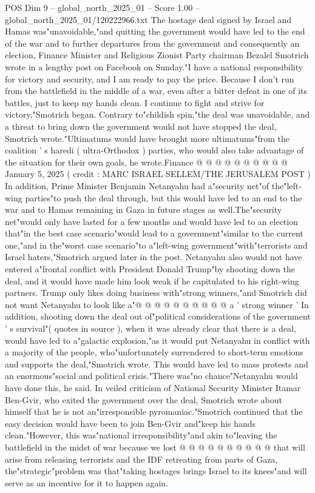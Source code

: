 \begin{textsample}{POS Dim 9 – global\_north\_2025\_01 – Score 1.00 – global\_north\_2025\_01/120222966.txt}  \label{ex:f9_pos_423}
The hostage deal signed by Israel and Hamas was"unavoidable,"and quitting the government would have led to the end of the war and to further departures from the government and consequently an election, Finance Minister and Religious Zionist Party chairman Bezalel Smotrich wrote in a lengthy post on Facebook on Sunday."I have a national responsibility for victory and security, and I am ready to pay the price.
Because I don't run from the battlefield in the middle of a war, even after a bitter defeat in one of its battles, just to keep my hands clean.
I continue to fight and strive for victory,"Smotrich began.
Contrary to"childish spin,"the deal was unavoidable, and a threat to bring down the government would not have stopped the deal, Smotrich wrote."Ultimatums would have brought more ultimatums"from the coalition ' s haredi ( ultra-Orthodox ) parties, who would also take advantage of the situation for their own goals, he wrote.Finance @ @ @ @ @ @ @ @ @ @ January 5, 2025 ( credit : MARC ISRAEL SELLEM/THE JERUSALEM POST ) In addition, Prime Minister Benjamin Netanyahu had a"security net"of the"left-wing parties"to push the deal through, but this would have led to an end to the war and to Hamas remaining in Gaza in future stages as well.The"security net"would only have lasted for a few months and would have led to an election that"in the best case scenario"would lead to a government"similar to the current one,"and in the"worst case scenario"to a"left-wing government"with"terrorists and Israel haters,"Smotrich argued later in the post.
Netanyahu also would not have entered a"frontal conflict with President Donald Trump"by shooting down the deal, and it would have made him look weak if he capitulated to his right-wing partners.
Trump only likes doing business with"strong winners,"and Smotrich did not want Netanyahu to look like a"@ @ @ @ @ @ @ @ @ @ a ' strong winner ' In addition, shooting down the deal out of"political considerations of the government ' s survival"( quotes in source ), when it was already clear that there is a deal, would have led to a"galactic explosion,"as it would put Netanyahu in conflict with a majority of the people, who"unfortunately surrendered to short-term emotions and supports the deal,"Smotrich wrote.
This would have led to mass protests and an enormous"social and political crisis."There was"no chance"Netanyahu would have done this, he said.
In veiled criticism of National Security Minister Itamar Ben-Gvir, who exited the government over the deal, Smotrich wrote about himself that he is not an"irresponsible pyromaniac."Smotrich continued that the easy decision would have been to join Ben-Gvir and"keep his hands clean."However, this was"national irresponsibility"and akin to"leaving the battlefield in the midst of war because we lost @ @ @ @ @ @ @ @ @ @ that will arise from releasing terrorists and the IDF retreating from parts of Gaza, the"strategic"problem was that"taking hostages brings Israel to its knees"and will serve as an incentive for it to happen again.

\end{textsample}
